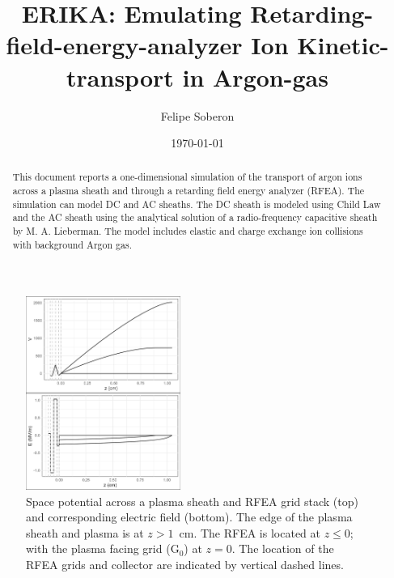 \documentclass[%
 aapm,
 mph,%
 amsmath,amssymb,
 reprint,%
]{revtex4-2}
\begin{document}

\title[Ion transport in a RFEA]{ERIKA: Emulating Retarding-field-energy-analyzer Ion Kinetic-transport in Argon-gas}

\author{Felipe Soberon}

\date{\today}%

\begin{abstract}
This document reports a one-dimensional simulation of the transport of argon ions across a plasma sheath and through a
retarding field energy analyzer (RFEA). The simulation can model DC and AC sheaths. The DC sheath is modeled using Child Law
and the AC sheath using the analytical solution of a radio-frequency capacitive sheath by M. A. Lieberman. The model includes
elastic and charge exchange ion collisions with background Argon gas. 
\end{abstract}

\maketitle

 




\begin{figure}[htbp]
    \centering
    \includegraphics[width=0.45\textwidth]{Figures/VEz2Pa13.56MHz2kVStack2332.jpeg}
    \caption{Space potential across a plasma sheath and RFEA grid stack (top) and corresponding electric field (bottom). The edge of the plasma sheath and plasma is at $z>1$~cm. The RFEA is located at $z\le0$; with the plasma facing grid (G$_0$) at $z=0$. The location of the RFEA grids and collector are indicated by vertical dashed lines.}
    \label{fig:your_label}
\end{figure}
\end{document}
